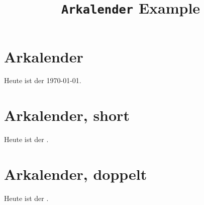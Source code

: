 \documentclass[a4paper,ngerman]{scrartcl}
\title{\texttt{Arkalender} Example}
\begin{document}
\maketitle

\section{Arkalender}

Heute ist der \today.

\section{Arkalender, short}

Heute ist der \todayshort.

\section{Arkalender, doppelt}

\renewcommand{\arraystretch}{0.8}
Heute ist der \todaydouble.
\end{document}
